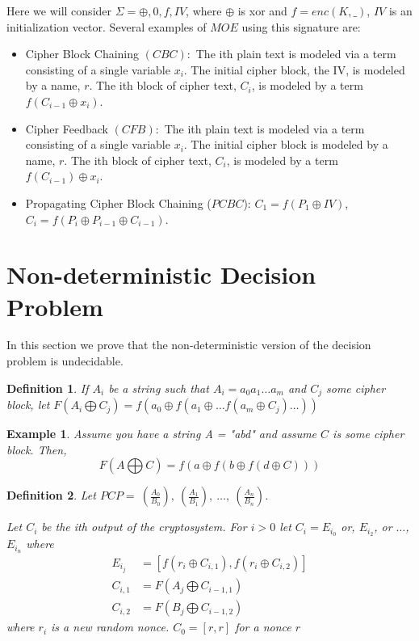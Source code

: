 \documentclass[11pt,twoside,a4paper]{article}
\newtheorem{definition}{Definition}
\newtheorem{example}{Example}
\begin{document}
Here we will consider $\Sigma ={\oplus, 0, f, IV}$, where $\oplus$ is xor and $f=enc(K,\_)$, $IV$ is an initialization vector.
Several examples of $MOE$ using this signature are: 
\begin{itemize}
	\item Cipher Block Chaining $(CBC):$ The ith plain text is modeled via a term consisting of a single variable $x_i$. The initial cipher block, the IV, is modeled by a name, $r$. The ith block of cipher text, $C_i$, is modeled by a
	term $f(C_{i-1} \oplus x_i)$.
	\item Cipher Feedback $(CFB):$ The ith plain text is modeled via a term consisting of a single variable $x_i$. The initial cipher block is modeled by a name, $r$. The ith block of cipher text, $C_i$, is modeled by a
	term $f(C_{i-1}) \oplus x_i$.  
	\item Propagating Cipher Block Chaining ($PCBC$): 
	$C_1 = f(P_1 \oplus IV)$, $C_i = f(P_i \oplus P_{i-1} \oplus C_{i-1})$.
\end{itemize}

\section{Non-deterministic Decision Problem}

In this section we prove that the non-deterministic version 
of the decision problem is undecidable.

\begin{definition}
If $A_i$ be a string such that $A_i = a_0 a_1\ldots a_m$ and 
$C_j$ some cipher block, let $F(A_i \bigoplus C_j) =
f(a_0 \oplus f(a_1 \oplus \ldots f(a_m \oplus C_j) \ldots ))$
\end{definition}

\begin{example}
Assume you have a string A = "abd" and assume $C$ is some cipher
block. Then, 
\[F(A \bigoplus C) = 
f(a \oplus f(b \oplus f(d \oplus C)))
\]
\end{example}



\begin{definition}\label{non-det-func}
Let $PCP = ~(\frac{A_0}{B_0}), ~(\frac{A_1}{B_1}), ~\ldots, ~(\frac{A_n}{B_n})$. 	
	
Let $C_i$ be the ith output of the cryptosystem. 
For $i > 0$ let $C_i = E_{i_0}$ or, $E_{i_2}$, or $\ldots$,
$E_{i_n}$ where 
\begin{align*}
	E_{i_j} &= [f(r_i \oplus C_{i, 1}), f(r_i \oplus C_{i,2}) ] \\
	C_{i,1} &= F(A_j \bigoplus C_{i-1, 1})	\\
	C_{i,2} &= F(B_j \bigoplus C_{i-1, 2}) 
\end{align*}
where $r_i$ is a new random nonce.
$C_0 = [r,r]$ for a nonce $r$
\end{definition}
\end{document}
